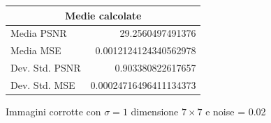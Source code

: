 \begin{figure}[H]
\begin{minipage}[h]{0.4\textwidth}
{\begin{tabular}{|lr|}
            \multicolumn{2}{|c|}{\textbf{Medie calcolate}} \\ \hline
            Media PSNR           & 29.2560497491376        \\
            Media MSE            & 0.0012124124340562978       \\
            Dev. Std. PSNR       & 0.903380822617657        \\
            Dev. Std. MSE        & 0.00024716496411134373      \\ \hline
            \end{tabular}
        }
    \end{minipage}
    \captionsetup{labelformat=andtable}
    \caption{Immagini corrotte con $\sigma = 1$ dimensione $7 \times 7$ e noise = 0.02}
\end{figure}


